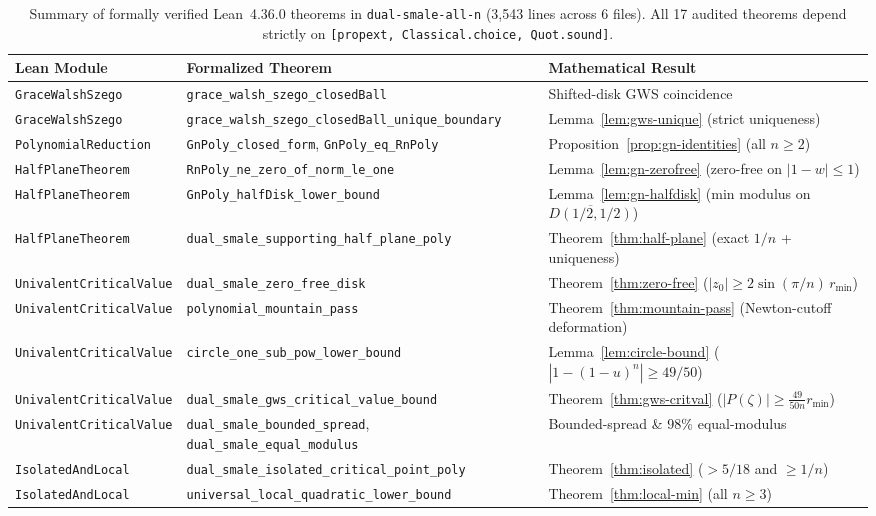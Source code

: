 \documentclass[11pt,a4paper]{article}
\theoremstyle{definition}
\theoremstyle{remark}
\begin{document}
\begin{table}[h]
\centering
\scriptsize
\begin{tabular}{@{}p{3.1cm}p{5.8cm}p{5.5cm}@{}}
\toprule
Lean Module & Formalized Theorem & Mathematical Result \\
\midrule
\texttt{GraceWalshSzego} & \texttt{grace\_walsh\_szego\_closedBall} & Shifted-disk GWS coincidence \\
\texttt{GraceWalshSzego} & \texttt{grace\_walsh\_szego\_closedBall\_unique\_boundary} & Lemma~\ref{lem:gws-unique} (strict uniqueness) \\
\texttt{PolynomialReduction} & \texttt{GnPoly\_closed\_form}, \texttt{GnPoly\_eq\_RnPoly} & Proposition~\ref{prop:gn-identities} (all $n \ge 2$) \\
\texttt{HalfPlaneTheorem} & \texttt{RnPoly\_ne\_zero\_of\_norm\_le\_one} & Lemma~\ref{lem:gn-zerofree} (zero-free on $|1-w|\le 1$) \\
\texttt{HalfPlaneTheorem} & \texttt{GnPoly\_halfDisk\_lower\_bound} & Lemma~\ref{lem:gn-halfdisk} (min modulus on $\overline{D(1/2,1/2)}$) \\
\texttt{HalfPlaneTheorem} & \texttt{dual\_smale\_supporting\_half\_plane\_poly} & Theorem~\ref{thm:half-plane} (exact $1/n$ + uniqueness) \\
\texttt{UnivalentCriticalValue} & \texttt{dual\_smale\_zero\_free\_disk} & Theorem~\ref{thm:zero-free} ($|z_0| \ge 2\sin(\pi/n)\,r_{\min}$) \\
\texttt{UnivalentCriticalValue} & \texttt{polynomial\_mountain\_pass} & Theorem~\ref{thm:mountain-pass} (Newton-cutoff deformation) \\
\texttt{UnivalentCriticalValue} & \texttt{circle\_one\_sub\_pow\_lower\_bound} & Lemma~\ref{lem:circle-bound} ($|1-(1-u)^n| \ge 49/50$) \\
\texttt{UnivalentCriticalValue} & \texttt{dual\_smale\_gws\_critical\_value\_bound} & Theorem~\ref{thm:gws-critval} ($|P(\zeta)| \ge \frac{49}{50n} r_{\min}$) \\
\texttt{UnivalentCriticalValue} & \texttt{dual\_smale\_bounded\_spread}, \texttt{dual\_smale\_equal\_modulus} & Bounded-spread \& 98\% equal-modulus \\
\texttt{IsolatedAndLocal} & \texttt{dual\_smale\_isolated\_critical\_point\_poly} & Theorem~\ref{thm:isolated} ($> 5/18$ and $\ge 1/n$) \\
\texttt{IsolatedAndLocal} & \texttt{universal\_local\_quadratic\_lower\_bound} & Theorem~\ref{thm:local-min} (all $n \ge 3$) \\
\bottomrule
\end{tabular}
\caption{Summary of formally verified Lean~4.36.0 theorems in \texttt{dual-smale-all-n} (3,543 lines across 6 files). All 17 audited theorems depend strictly on \texttt{[propext, Classical.choice, Quot.sound]}.}
\label{tab:lean}
\end{table}
\end{document}
